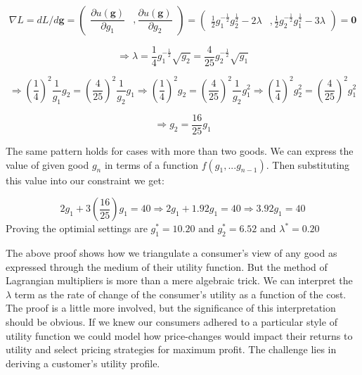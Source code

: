 \documentclass{tufte-handout}
\begin{document}
\begin{fullwidth}
\begin{example}

\[
\nabla L = dL /  d\mathbf{g} =
    \begin{pmatrix}
       \dfrac{\partial u(\mathbf{g})}{\partial g_1}   & , \dfrac{\partial u(\mathbf{g})}{\partial g_2}
    \end{pmatrix} = \begin{pmatrix}
    \frac{1}{2}g_{1}^{-\frac{1}{2}}g_{2}^{\frac{1}{2} } - 2\lambda & ,
    \frac{1}{2}g_{2}^{-\frac{1}{2}}g_{1}^{\frac{1}{2} } - 3\lambda
    \end{pmatrix} = \mathbf{0}
  \]


$$ \Rightarrow \lambda = \frac{1}{4}g_{1}^{-\frac{1}{2}}\sqrt{g_{2}} = \frac{4}{25}g_{2}^{-\frac{1}{2}}\sqrt{g_{1}}$$

$$ \Rightarrow  (\frac{1}{4})^2\frac{1}{g_{1}}g_{2} = (\frac{4}{25})^2\frac{1}{g_{2}}g_{1} \Rightarrow (\frac{1}{4})^2 g_{2} = (\frac{4}{25})^2\frac{1}{g_{2}}g_{1}^2  \Rightarrow (\frac{1}{4})^2g_{2}^{2} = (\frac{4}{25})^2g_{1}^2 $$ 

$$ \Rightarrow g_{2} = \frac{16}{25}g_{1}$$

\noindent The same pattern holds for cases with more than two goods. We can express the value of given good $g_n$ in terms of a function $f(g_{1}, ... g_{n-1}) $. Then substituting this value into our constraint we get: 

$$ 2g_{1} + 3(\frac{16}{25})g_{1} = 40 \Rightarrow 2g_{1} + 1.92g_{1} = 40 \Rightarrow 3.92g_{1} = 40$$
Proving the optimial settings are  $g_{1}^{*} = 10.20 \text{ and } g_{2}^{*} = 6.52 \text{ and } \lambda^{*} = 0.20 $

\end{example}
\end{fullwidth}

\noindent The above proof shows how we triangulate a consumer's view of any good as expressed through the medium of their utility function. But the method of Lagrangian multipliers is more than a mere algebraic trick. We can interpret the $\lambda$ term as the rate of change of the consumer's utility as a function of the cost. The proof is a little more involved, but the significance of this interpretation should be obvious. If we knew our consumers adhered to a particular style of utility function we could model how price-changes would impact their returns to utility and select pricing strategies for maximum profit. The challenge lies in deriving a customer's utility profile.
\end{document}
